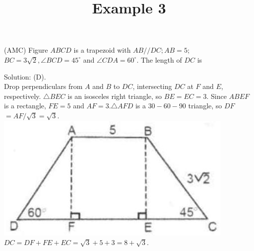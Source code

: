 \documentclass{article}
\title{Example 3}
\date{}
\begin{document}
\maketitle

(AMC) Figure \(A B C D\) is a trapezoid with \(A B / / D C ; A B=5\);\\
\(B C=3 \sqrt{2}, \angle B C D=45^{\circ}\) and \(\angle C D A=60^{\circ}\). The length of \(D C\) is

Solution: (D).\\
Drop perpendiculars from \(A\) and \(B\) to \(D C\), intersecting \(D C\) at \(F\) and \(E\), respectively. \(\triangle B E C\) is an isosceles right triangle, so \(B E=E C=3\). Since \(A B E F\) is a rectangle, \(F E=5\) and \(A F=3 . \triangle A F D\) is a \(30-60-90\) triangle, so \(D F\) \(=A F / \sqrt{3}=\sqrt{3}\).\\
\centering
\includegraphics[width=\textwidth]{images/076(2).jpg}\\
\(D C=D F+F E+E C=\sqrt{3}+5+3=8+\sqrt{3}\).
\end{document}
